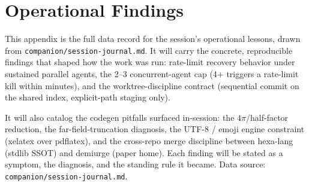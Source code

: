 \section{Operational Findings}
\label{app:operational}

This appendix is the full data record for the session's operational
lessons, drawn from \texttt{companion/\allowbreak session-journal.md}.
It will
carry the concrete, reproducible findings that shaped how the work was
run: rate-limit recovery behavior under sustained parallel agents, the
2--3 concurrent-agent cap (4+ triggers a rate-limit kill within minutes),
and the worktree-discipline contract (sequential commit on the shared
index, explicit-path staging only).

It will also catalog the codegen pitfalls surfaced in-session: the
$4\pi$/half-factor reduction, the far-field-truncation diagnosis, the
UTF-8 / emoji engine constraint (xelatex over pdflatex), and the
cross-repo merge discipline between hexa-lang (stdlib SSOT) and
demiurge (paper home). Each finding will be stated as a symptom, the
diagnosis, and the standing rule it became. Data source:
\texttt{companion/session-journal.md}.
